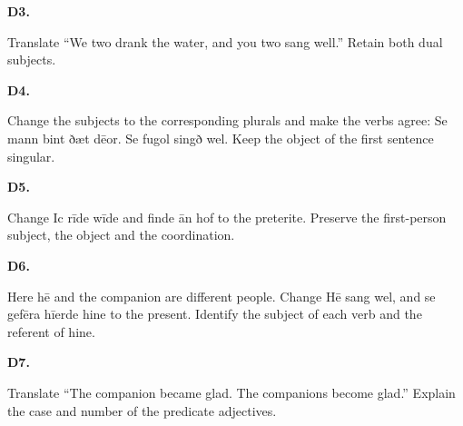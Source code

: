 \par\begin{minipage}{\linewidth}\raggedright
\textbf{D3.}

Translate “We two drank the water, and you two sang well.” Retain both dual subjects.

\end{minipage}\par\addvspace{4pt}

\par\begin{minipage}{\linewidth}\raggedright
\textbf{D4.}

Change the subjects to the corresponding plurals and make the verbs agree: Se mann bint ðæt dēor. Se fugol singð wel. Keep the object of the first sentence singular.

\end{minipage}\par\addvspace{4pt}

\par\begin{minipage}{\linewidth}\raggedright
\textbf{D5.}

Change Ic rīde wīde and finde ān hof to the preterite. Preserve the first-person subject, the object and the coordination.

\end{minipage}\par\addvspace{4pt}

\par\begin{minipage}{\linewidth}\raggedright
\textbf{D6.}

Here hē and the companion are different people. Change Hē sang wel, and se gefēra hīerde hine to the present. Identify the subject of each verb and the referent of hine.

\end{minipage}\par\addvspace{4pt}

\par\begin{minipage}{\linewidth}\raggedright
\textbf{D7.}

Translate “The companion became glad. The companions become glad.” Explain the case and number of the predicate adjectives.

\end{minipage}\par\addvspace{4pt}

